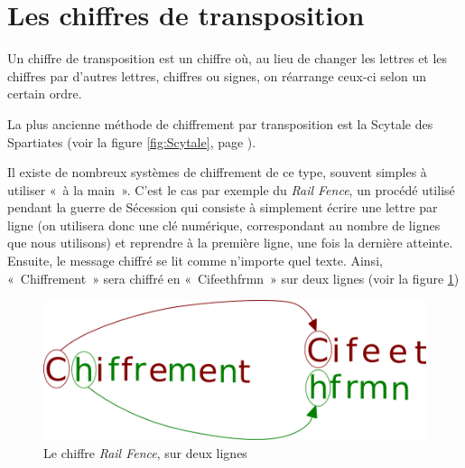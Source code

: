 \section{Les chiffres de transposition\label{sec:Transposition}}
Un chiffre de transposition est un chiffre où, au lieu de changer
les lettres et les chiffres par d'autres lettres, chiffres ou signes,
on réarrange ceux-ci selon un certain ordre.

La plus ancienne méthode de chiffrement par transposition est la
Scytale des Spartiates (voir la figure \ref{fig:Scytale}, page
\pageref{fig:Scytale}).

Il existe de nombreux systèmes de chiffrement de ce type, souvent
simples à utiliser «~à la main~». C'est le cas par exemple du
\emph{Rail Fence}, un procédé utilisé pendant la guerre de Sécession
qui consiste à simplement écrire une lettre par ligne (on utilisera donc
une clé numérique, correspondant au nombre de lignes que nous utilisons) et
reprendre à la première ligne, une fois la dernière atteinte. Ensuite,
le message chiffré se lit comme n'importe quel texte.
Ainsi, «~Chiffrement~» sera chiffré en «~Cifeethfrmn~» sur deux
lignes (voir la figure \ref{fig:Transposition})
\begin{figure}[h]
  \begin{center}
    \includegraphics[scale=0.4]{images/Transposition.png}
  \end{center}
  \caption{Le chiffre \emph{Rail Fence}, sur deux lignes}
  \label{fig:Transposition}
\end{figure}

